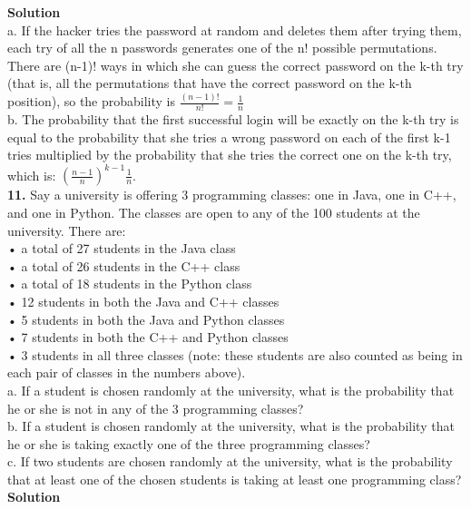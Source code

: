 \documentclass[10pt,a4paper,oneside,draft]{report}
\begin{document}
\textbf{Solution} \\

a. If the hacker tries the password at random and deletes them after trying them, each try of all the n passwords generates one of the n! possible permutations. There are (n-1)! ways in which she can guess the correct password on the k-th try (that is, all the permutations that have the correct password on the k-th position), so the probability is $\frac{(n-1)!}{n!} = \frac{1}{n}$ \\

b. The probability that the first successful login will be exactly on the k-th try is equal to the probability that she tries a wrong password on each of the first k-1 tries multiplied by the probability that she tries the correct one on the k-th try, which is: $(\frac{n-1}{n})^{k-1} \frac{1}{n}$. \\

\textbf{11.} Say a university is offering 3 programming classes: one in Java, one in C++, and one in
Python. The classes are open to any of the 100 students at the university. There are:\\
• a total of 27 students in the Java class\\
• a total of 26 students in the C++ class\\
• a total of 18 students in the Python class\\
• 12 students in both the Java and C++ classes\\
• 5 students in both the Java and Python classes\\
• 7 students in both the C++ and Python classes\\
• 3 students in all three classes (note: these students are also counted as being in each pair of classes in the numbers above).\\
a. If a student is chosen randomly at the university, what is the probability that he or she is not in any of the 3 programming classes? \\
b. If a student is chosen randomly at the university, what is the probability that he or she is taking exactly one of the three programming classes? \\
c. If two students are chosen randomly at the university, what is the probability that at least one of the chosen students is taking at least one programming class? \\

\textbf{Solution} \\
\end{document}
